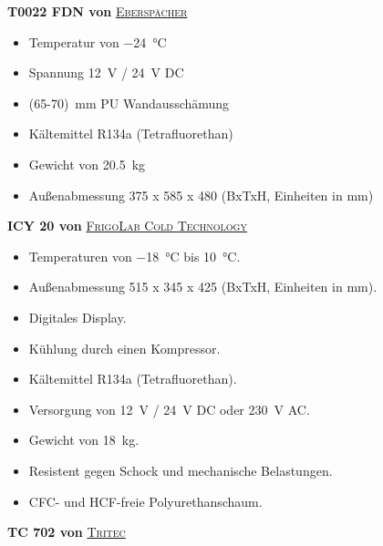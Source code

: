 	\textbf{T0022 FDN von} \href{https://www.eberspaecher-klima.de/fileadmin/data/corporatesite/pdf/de/4_air_conditioning/gp/fh_gp_kuehlcontainer_de.pdf}{\textsc{Eberspächer}}

	\begin{itemize}
		\item Temperatur von \SI{-24}{\celsius}
		\item Spannung \SI{12}{\volt} / \SI{24}{\volt} DC
		\item \SI{(65-70)}{\milli\metre} PU Wandausschämung
		\item Kältemittel R134a (Tetrafluorethan)
		\item Gewicht von \SI{20,5}{\kilo\gram}
		\item Außenabmessung 375 x 585 x 480 (BxTxH, Einheiten in mm)
	\end{itemize}

	\textbf{ICY 20 von} \href{https://www.frigolab.eu/gb/dometic-portable-freezers/67-icy-20.html#/47-normal_or_heated_refrigerator-heated_18c40c}{\textsc{FrigoLab Cold Technology}}

	\begin{itemize}
		\item Temperaturen von \SI{-18}{\celsius} bis \SI{10}{\celsius}.
		\item Außenabmessung 515 x 345 x 425 (BxTxH, Einheiten in mm).
		\item Digitales Display.
		\item Kühlung durch einen Kompressor.
		\item Kältemittel R134a (Tetrafluorethan).
		\item Versorgung von \SI{12}{\volt} / \SI{24}{\volt} DC oder \SI{230}{\volt} AC.
		\item Gewicht von \SI{18}{\kilo\gram}.
		\item Resistent gegen Schock und mechanische Belastungen.
		\item CFC- und HCF-freie Polyurethanschaum.
	\end{itemize}

	\textbf{TC 702 von} \href{https://www.tritec-klima.de/datenblaetter/de/kaelte/portable/TD-TC702.pdf}{\textsc{Tritec}}

